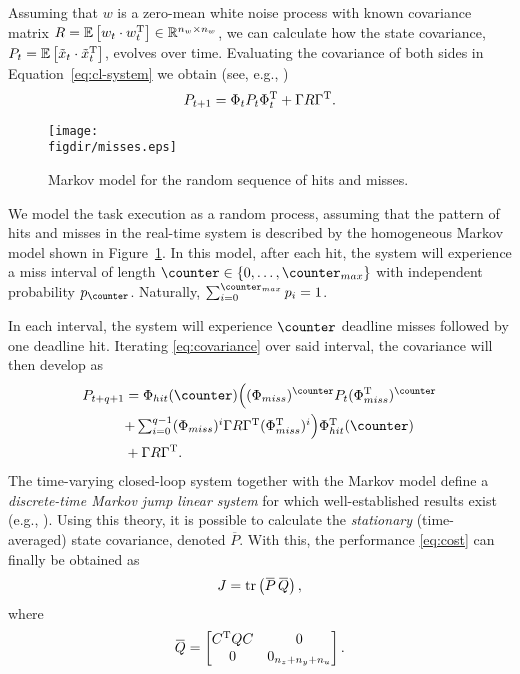 Assuming that $w$ is a zero-mean white noise process with known covariance matrix $R = \mathbb{E}\left[ w_t \cdot w_t^{\mathrm{\small{T}}} \right] \in \mathbb{R}^{n_w \times n_w}$, we can calculate how the state covariance, $P_t = \mathbb{E}\left[ \tilde{x}_t\cdot \tilde{x}_t^{\mathrm{\small{T}}} \right]$, evolves over time.
Evaluating the covariance of both sides in Equation~\eqref{eq:cl-system} we obtain (see, e.g., \cite{AstWit:1984})
\begin{equation}
    \label{eq:covariance}
    P_{t+1} = \clmat{}_t P_t \clmat{}_t^{\T} + \clinp{} R \clinp{}^{\T} .
\end{equation}

\begin{figure}[t]
    \centerline{\texttt{[image: \\figdir/misses.eps]}}
    \caption{Markov model for the random sequence of hits and misses.}
    \label{fig:Markov}
\end{figure}

We model the task execution as a random process, assuming that the pattern of hits and misses in the real-time system is described by the homogeneous Markov model shown in Figure~\ref{fig:Markov}.
In this model, after each hit, the system will experience a miss interval of length $\counter \in \{0,\ldots,\counter_{max}\}$ with independent probability $p_\counter$. Naturally, $\sum_{i=0}^{\counter_{max}} p_i = 1$.

In each interval, the system will experience $\counter$ deadline misses followed by one deadline hit. Iterating \eqref{eq:covariance} over said interval, the covariance will then develop as
\begin{equation*}
    \label{eq:intervalP}
    \begin{aligned}
        P_{t+q+1} &= \clmat{}_{hit}(\counter)  \Bigl((\clmat{}_{miss})^\counter P_t (\clmat{}_{miss}^{\T})^\counter \Bigr.\\
        &\Bigl.+ \textstyle\sum_{i=0}^{q-1} (\clmat{}_{miss})^i \clinp{} R \clinp{}^{\T} (\clmat{}_{miss}^{\T})^i \Bigr)\clmat{}_{hit}^{\T}(\counter)  \\
        &+ \clinp{} R \clinp{}^{\T} .
    \end{aligned}
\end{equation*}
The time-varying closed-loop system together with the Markov model define a \emph{discrete-time Markov jump linear system} for which well-established results exist (e.g., \cite{Blair:1975,Nilsson:1998,Lincoln:2002}). Using this theory, it is possible to calculate the \emph{stationary} (time-averaged) state covariance, denoted $\overbar{P}$. With this, the performance \eqref{eq:cost} can finally be obtained as
\begin{equation*}
    J = \trace{ \overbar{P} \, \overbar{Q} },
\end{equation*}
where
\begin{equation*}
    \overbar{Q} = \begin{bmatrix}
        C^{\T}Q C & 0 \\ 0 & 0_{n_z+n_y+n_u}
    \end{bmatrix}.
\end{equation*}

